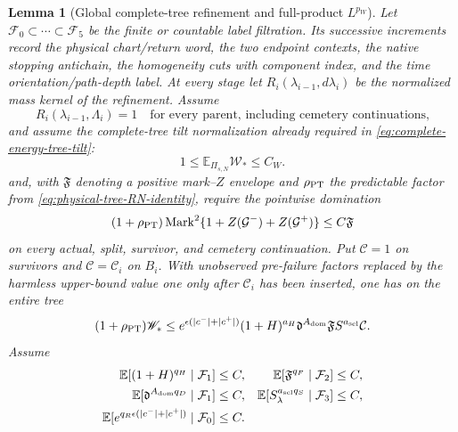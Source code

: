 \documentclass[11pt]{article}
\newtheorem{lemma}[theorem]{Lemma}
\begin{document}
\begin{lemma}[Global complete-tree refinement and full-product $L^{p_W}$]
\label{lem:measurable-refinement-moments}
Let $\mathcal F_0\subset\cdots\subset\mathcal F_5$ be the finite or countable
label filtration.  Its successive increments record the physical
chart/return word, the two endpoint contexts, the native stopping antichain,
the homogeneity cuts with component index, and the time
orientation/path-depth label.  At every stage let
$R_i(\lambda_{i-1},d\lambda_i)$ be the normalized
mass kernel of the refinement.  Assume
\begin{equation}
\label{eq:refinement-kernel-mass}
 R_i(\lambda_{i-1},\Lambda_i)=1
 \quad\text{for every parent, including cemetery continuations,}
\end{equation}
and assume the complete-tree tilt normalization already required in
\eqref{eq:complete-energy-tree-tilt}:
\begin{equation}
\label{eq:full-product-weight-normalization}
 1\le\mathbb E_{\Pi_{s,N}}\mathscr W_*\le C_W.
\end{equation}
and, with $\mathfrak F$ denoting a positive mark--$Z$ envelope and
$\rho_{\rm PT}$ the predictable factor from
\eqref{eq:physical-tree-RN-identity}, require the
pointwise domination
\begin{equation}
\label{eq:full-mark-cemetery-domination}
 (1+\rho_{\rm PT})\operatorname{Mark}^2
 \{1+Z(\mathcal G^-)+Z(\mathcal G^+)\}\le C\mathfrak F
\end{equation}
on every actual, split, survivor, and cemetery continuation.  Put
$\mathcal C=1$ on survivors and $\mathcal C=\mathcal C_i$ on $B_i$.
With unobserved pre-failure factors replaced by the harmless upper-bound
value one only after $\mathcal C_i$ has been inserted, one has on the entire
tree
\begin{equation}
\label{eq:full-cemetery-product-envelope}
 (1+\rho_{\rm PT})\mathscr W_*\le
 e^{\epsilon(|c^-|+|c^+|)}(1+H)^{a_H}
 \mathfrak d^{A_{\rm dom}}\mathfrak F
 S^{a_{\rm scl}}\mathcal C.
\end{equation}
Assume
\begin{align}
 \mathbb E[(1+H)^{q_H}\mid\mathcal F_1]&\le C,&
 \mathbb E[\mathfrak F^{q_F}\mid\mathcal F_2]&\le C,
 \label{eq:conditional-refinement-moments}\\
 \mathbb E[\mathfrak d^{A_{\rm dom}q_D}\mid\mathcal F_1]&\le C,&
 \mathbb E[S_\lambda^{a_{\rm scl}q_S}\mid\mathcal F_3]&\le C,
 \notag\\
 \mathbb E[e^{q_R\epsilon(|c^-|+|c^+|)}\mid\mathcal F_0]&\le C.

\end{align}
\end{lemma}
\end{document}
